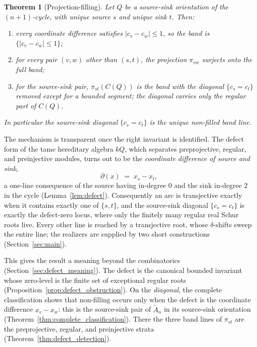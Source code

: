\documentclass[11pt, a4paper]{amsart}
\newtheorem{theorem}{Theorem}[section]
\theoremstyle{definition}
\begin{document}
\begin{theorem}[Projection-filling]
\label{thm:main}
Let $Q$ be a source-sink orientation of the $(n+1)$-cycle, with unique source
$s$ and unique sink $t$. Then:
\begin{enumerate}[label=\textup{(\arabic*)}]
\item every coordinate difference satisfies $|c_v - c_w| \leq 1$, so the
  band is $\{|c_v - c_w| \leq 1\}$;
\item for every pair $(v, w)$ other than $(s, t)$, the projection
  $\pi_{vw}$ surjects onto the full band;
\item for the source-sink pair, $\pi_{st}(C(Q))$ is the band with the
  diagonal $\{c_s = c_t\}$ removed except for a bounded segment; the
  diagonal carries only the regular part of $C(Q)$.
\end{enumerate}
In particular the source-sink diagonal $\{c_s = c_t\}$ is the unique
non-filled band line.
\end{theorem}

The mechanism is transparent once the right invariant is identified. The
defect form of the tame hereditary algebra $kQ$, which separates
preprojective, regular, and preinjective modules, turns out to be the
\emph{coordinate difference of source and sink},
\[
  \partial(x) \;=\; x_s - x_t,
\]
a one-line consequence of the source having in-degree $0$ and the sink
in-degree $2$ in the cycle (Lemma~\ref{lem:defect}). Consequently an arc
is transjective exactly when it contains exactly one of $\{s, t\}$, and
the source-sink diagonal $\{c_s = c_t\}$ is exactly the defect-zero
locus, where only the finitely many regular real Schur roots live. Every
other line is reached by a transjective root, whose $\delta$-shifts sweep
the entire line; the realizers are supplied by two short constructions
(Section~\ref{sec:main}).

This gives the result a meaning beyond the combinatorics
(Section~\ref{sec:defect_meaning}). The defect is the canonical bounded
invariant whose zero-level is the finite set of exceptional regular roots
(Proposition~\ref{prop:defect_obstruction}). On the \emph{diagonal}, the
complete classification shows that non-filling occurs only when the defect
is the coordinate difference $x_v-x_w$: this is the source-sink pair of
$\widetilde A_n$ in its source-sink orientation
(Theorem~\ref{thm:complete_classification}). There
the three band lines
of $\pi_{st}$ are the preprojective, regular, and preinjective strata
(Theorem~\ref{thm:defect_detection}).
\end{document}
